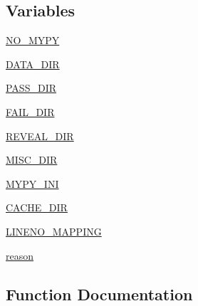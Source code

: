 \subsection*{Variables}
\begin{DoxyCompactItemize}
\item 
\hyperlink{namespacenumpy_1_1typing_1_1tests_1_1test__typing_ab87fdd16b36f2936955ece220ded3d1b}{N\+O\+\_\+\+M\+Y\+PY}
\item 
\hyperlink{namespacenumpy_1_1typing_1_1tests_1_1test__typing_a98d3ecbcc164c8ba2c4ee01c7027f3a7}{D\+A\+T\+A\+\_\+\+D\+IR}
\item 
\hyperlink{namespacenumpy_1_1typing_1_1tests_1_1test__typing_a62f9a91af40c2856daa407679fc842c3}{P\+A\+S\+S\+\_\+\+D\+IR}
\item 
\hyperlink{namespacenumpy_1_1typing_1_1tests_1_1test__typing_adb349f931466c29bc87e84dc10ca0add}{F\+A\+I\+L\+\_\+\+D\+IR}
\item 
\hyperlink{namespacenumpy_1_1typing_1_1tests_1_1test__typing_aa0ccc12efef852f3c8e1081de80cc074}{R\+E\+V\+E\+A\+L\+\_\+\+D\+IR}
\item 
\hyperlink{namespacenumpy_1_1typing_1_1tests_1_1test__typing_a3d969eedd3ee1d89211ef962a160ed44}{M\+I\+S\+C\+\_\+\+D\+IR}
\item 
\hyperlink{namespacenumpy_1_1typing_1_1tests_1_1test__typing_ac791a2e8c7bc05c9ed9841a82c07b02d}{M\+Y\+P\+Y\+\_\+\+I\+NI}
\item 
\hyperlink{namespacenumpy_1_1typing_1_1tests_1_1test__typing_af687d9bf9e650c9c148699483125877d}{C\+A\+C\+H\+E\+\_\+\+D\+IR}
\item 
\hyperlink{namespacenumpy_1_1typing_1_1tests_1_1test__typing_a45ec6fcc8067b51efc581145c5e7087f}{L\+I\+N\+E\+N\+O\+\_\+\+M\+A\+P\+P\+I\+NG}
\item 
\hyperlink{namespacenumpy_1_1typing_1_1tests_1_1test__typing_a887a7dbb5fc3a76132d2dd62410f174c}{reason}
\end{DoxyCompactItemize}


\subsection{Function Documentation}
\mbox{\label{namespacenumpy_1_1typing_1_1tests_1_1test__typing_ad8ed7f58a377f72e368336608994fe1a}} 

